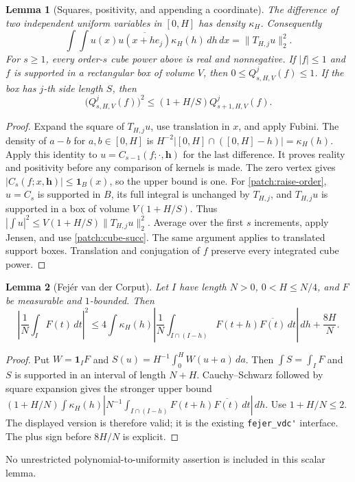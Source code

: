\documentclass[11pt]{article}
\newtheorem{lemma}[lemma]{Lemma}
\theoremstyle{definition}
\newcommand{\pid}[1]{\nolinkurl{#1}}
\begin{document}
\begin{lemma}[Squares, positivity, and appending a coordinate]\label{patch:fejer-squares}
The difference of two independent uniform variables in $[0,H]$ has density $\kappa_H$.
Consequently
\[
 \int\!\int u(x)\overline{u(x+he_j)}\kappa_H(h)\,dh\,dx
       =\|T_{H,j}u\|_2^2.
\]
For $s\geq1$, every order-$s$ cube power above is real and nonnegative.  If $|f|\leq1$ and $f$ is supported in a
rectangular box of volume $V$, then $0\leq Q_{s,H,V}^{j}(f)\leq1$.
If the box has $j$-th side length $S$, then
\begin{equation}\label{patch:raise-order}
 \bigl(Q_{s,H,V}^{j}(f)\bigr)^2
       \leq(1+H/S)Q_{s+1,H,V}^{j}(f).
\end{equation}
\end{lemma}
\begin{proof}
Expand the square of $T_{H,j}u$, use translation in $x$, and apply Fubini.  The density of
$a-b$ for $a,b\in[0,H]$ is $H^{-2}|[0,H]\cap([0,H]-h)|=\kappa_H(h)$.
Apply this identity to $u=C_{s-1}(f;\cdot,\mathbf h)$ for the last difference.  It proves
reality and positivity before any comparison of kernels is made.  The zero vertex gives
$|C_s(f;x,\mathbf h)|\leq\mathbf1_B(x)$, so the upper bound is one.
For \eqref{patch:raise-order}, $u=C_s$ is supported in $B$, its full integral is unchanged
by $T_{H,j}$, and $T_{H,j}u$ is supported in a box of volume $V(1+H/S)$.
Thus $|\int u|^2\leq V(1+H/S)\|T_{H,j}u\|_2^2$.  Average over the first $s$ increments,
apply Jensen, and use \eqref{patch:cube-succ}.  The same argument applies to translated
support boxes.  Translation and conjugation of $f$ preserve every integrated cube power.
\end{proof}

\begin{lemma}[Fej\'er van der Corput]\label{lem:fejer-vdc}
Let $I$ have length $N>0$, $0<H\leq N/4$, and $F$ be measurable and $1$-bounded.  Then
\[
 \left|\frac1N\int_I F(t)\,dt\right|^2
 \leq4\int\kappa_H(h)
       \left|\frac1N\int_{I\cap(I-h)}F(t+h)\overline{F(t)}\,dt\right|\,dh
       +\frac{8H}{N}.
\]
\end{lemma}
\begin{proof}
Put $W=\mathbf1_IF$ and $S(u)=H^{-1}\int_0^H W(u+a)\,da$.
Then $\int S=\int_I F$ and $S$ is supported in an interval of length $N+H$.
Cauchy--Schwarz followed by square expansion gives the stronger upper bound
$(1+H/N)\int\kappa_H(h)|N^{-1}\int_{I\cap(I-h)}F(t+h)\overline{F(t)}\,dt|\,dh$.
Use $1+H/N\leq2$.  The displayed version is therefore valid; it is the existing
\pid{fejer_vdc'} interface.  The plus sign before $8H/N$ is explicit.
\end{proof}
No unrestricted polynomial-to-uniformity assertion is included in this scalar lemma.
\end{document}
